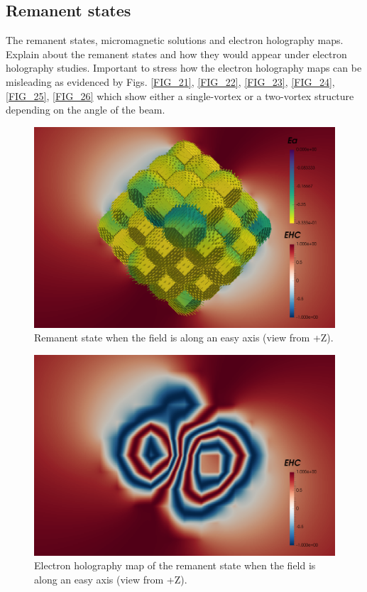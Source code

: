 \subsection{Remanent states}
The remanent states, micromagnetic solutions and electron holography maps. Explain about the remanent states and how they would appear under electron holography studies. Important to stress how the electron holography maps can be misleading as evidenced by Figs. \ref{FIG_21}, \ref{FIG_22}, \ref{FIG_23}, \ref{FIG_24}, \ref{FIG_25}, \ref{FIG_26} which show either a single-vortex or a two-vortex structure depending on the angle of the beam.\par
\begin{figure}
\centering
\includegraphics[width=\textwidth]{research-4/figs/fram_i21_f0_-z.png}
\caption[Remanent state when the field is along an easy axis (view from +Z)]{Remanent state when the field is along an easy axis (view from +Z).}
\label{FIG_15}
\end{figure}

\begin{figure}
\centering
\includegraphics[width=\textwidth]{research-4/figs/fram_i21_f0_-z_EHC.png}
\caption[Electron holography map of the remanent state when the field is along an easy axis (view from +Z)]{Electron holography map of the remanent state when the field is along an easy axis (view from +Z).}
\label{FIG_16}
\end{figure}

